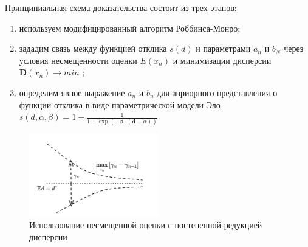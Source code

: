 Принципиальная схема доказательства состоит из трех этапов:
 \begin{enumerate}
    \item используем модифицированный алгоритм Роббинса-Монро; 
    \item зададим связь между функцией отклика $s(d)$ и параметрами $a_n$ и $b_N$ через условия несмещенности оценки $E(x_n)$ и
минимизации дисперсии $\mathbf{D}(x_n) \rightarrow min$  \cite{hu1997strong} \cite{hu1998sequential};
    \item определим явное выражение $a_n$ и $b_n$ для априорного представления о функции отклика в виде параметрической модели Эло $s(d,\alpha,\beta) = 1 - \frac{1}{1+\exp\left(-\beta \cdot(\mathbf{d} -\alpha)\right)}$
\end{enumerate}

\begin{figure}[h!]
    \centering
    \includegraphics[width=0.5\textwidth]{assets/work/rating/dispersion_reduction.png}
    \caption{Использование несмещенной оценки с постепенной редукцией дисперсии}
    \label{principal_scheme}
\end{figure}

